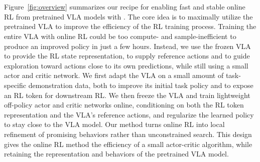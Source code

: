 \section{\FullMethodName{}}
\label{sec:method}


Figure~\ref{fig:overview} summarizes our recipe for enabling fast and stable online RL from pretrained VLA models with \MethodName{}. The core idea is to maximally utilize the pretrained VLA to improve the efficiency of the RL training process. Training the entire VLA with online RL could be too compute- and sample-inefficient to produce an improved policy in just a few hours. Instead, we use the frozen VLA to provide the RL state representation, to supply reference actions and to guide exploration toward actions close to its own predictions, while still using a small actor and critic network.
We first adapt the VLA on a small amount of task-specific demonstration data, both to improve its initial task policy and to expose an RL token for downstream RL.
We then freeze the VLA and train lightweight off-policy actor and critic networks online, conditioning on both the RL token representation and the VLA's reference actions,
and regularize the learned policy to stay close to the VLA model.
Our method turns online RL into local refinement of promising behaviors rather than unconstrained search. This design gives the online RL method the efficiency of a small actor-critic algorithm, while retaining the representation and behaviors of the pretrained VLA model. 

 

